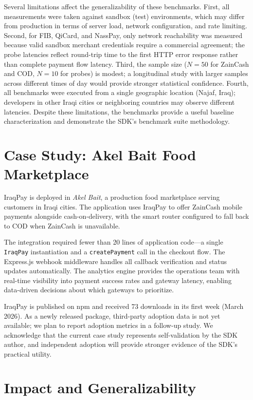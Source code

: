 \documentclass[10pt, a4paper, oneside]{article}
\begin{document}
Several limitations affect the generalizability of these benchmarks. First, all measurements were taken against sandbox (test) environments, which may differ from production in terms of server load, network configuration, and rate limiting. Second, for FIB, QiCard, and NassPay, only network reachability was measured because valid sandbox merchant credentials require a commercial agreement; the probe latencies reflect round-trip time to the first HTTP error response rather than complete payment flow latency. Third, the sample size ($N=50$ for ZainCash and COD, $N=10$ for probes) is modest; a longitudinal study with larger samples across different times of day would provide stronger statistical confidence. Fourth, all benchmarks were executed from a single geographic location (Najaf, Iraq); developers in other Iraqi cities or neighboring countries may observe different latencies. Despite these limitations, the benchmarks provide a useful baseline characterization and demonstrate the SDK's benchmark suite methodology.


\section{Case Study: Akel Bait Food Marketplace}

IraqPay is deployed in \emph{Akel Bait}, a production food marketplace serving customers in Iraqi cities. The application uses IraqPay to offer ZainCash mobile payments alongside cash-on-delivery, with the smart router configured to fall back to COD when ZainCash is unavailable.

The integration required fewer than 20 lines of application code---a single \texttt{IraqPay} instantiation and a \texttt{createPayment} call in the checkout flow. The Express.js webhook middleware handles all callback verification and status updates automatically. The analytics engine provides the operations team with real-time visibility into payment success rates and gateway latency, enabling data-driven decisions about which gateways to prioritize.

IraqPay is published on npm and received 73 downloads in its first week (March 2026). As a newly released package, third-party adoption data is not yet available; we plan to report adoption metrics in a follow-up study. We acknowledge that the current case study represents self-validation by the SDK author, and independent adoption will provide stronger evidence of the SDK's practical utility.


\section{Impact and Generalizability}
\end{document}

